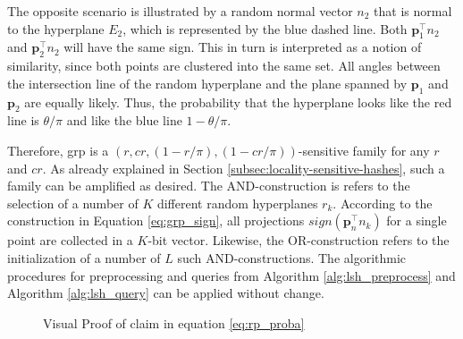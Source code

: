 \documentclass[../../../main.tex]{subfiles}
\begin{document}
The opposite scenario is illustrated by a random normal vector $n_2$ that is normal to the hyperplane $E_2$, which is represented by the blue dashed line. Both $\bm{p}_1^\top n_2$ and  $\bm{p}_2^\top n_2$ will have the same sign. This in turn is interpreted as a notion of similarity, since both points are clustered into the same set. All angles between the intersection line of the random hyperplane and the plane spanned by $\bm{p}_1$ and $\bm{p}_2$ are equally likely. Thus, the probability that the hyperplane looks like the red line is $\theta / \pi$ and like the blue line $1 - \theta / \pi$.

Therefore, \gls{grp} is a $(r, cr, (1-r/\pi), (1-cr/\pi))$-sensitive family for any $r$ and $cr$. As already explained in Section \ref{subsec:locality-sensitive-hashes}, such a family can be amplified as desired. The AND-construction is refers to the selection of a number of $K$ different random hyperplanes $r_k$. According to the construction in Equation \ref{eq:grp_sign}, all projections $sign(\bm{p}_n^\top n_k)$ for a single point are collected in a $K$-bit vector. Likewise, the OR-construction refers to the initialization of a number of $L$ such AND-constructions. The algorithmic procedures for preprocessing and queries from Algorithm \ref{alg:lsh_preprocess} and Algorithm \ref{alg:lsh_query} can be applied without change. 

\begin{figure}[t]
    \centering
    
    \caption{Visual Proof of claim in equation \ref{eq:rp_proba}}
    \label{fig:rp_2d}
\end{figure}
\end{document}
